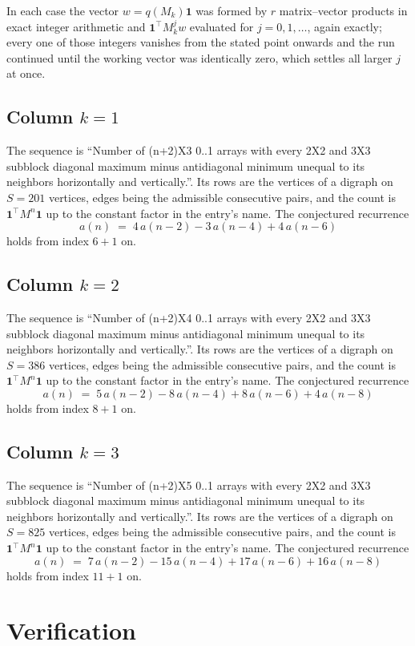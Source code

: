 \documentclass[11pt,a4paper]{article}
\theoremstyle{plain}
\theoremstyle{definition}
\begin{document}
In each case the vector $w=q(M_k)\mathbf{1}$ was formed by $r$ matrix--vector products in
exact integer arithmetic and $\mathbf{1}^{\!\top}M_k^{j}w$ evaluated for $j=0,1,\dots$,
again exactly; every one of those integers vanishes from the stated point onwards and the run
continued until the working vector was identically zero, which settles all larger $j$ at once.

\subsection*{Column $k$$=1$}
The sequence is ``Number of (n+2)X3 0..1 arrays with every 2X2 and 3X3 subblock diagonal maximum minus antidiagonal minimum unequal to its neighbors horizontally and vertically.''. Its rows are the vertices of a digraph on
$S=201$ vertices, edges being the admissible consecutive pairs, and the count is
$\mathbf{1}^{\!\top}M^{n}\mathbf{1}$ up to the constant factor in the entry's name.
The conjectured recurrence
\[
a(n)\;=\;4\,a(n-2) - 3\,a(n-4) + 4\,a(n-6)
\]
holds from index $6+1$ on.

\subsection*{Column $k$$=2$}
The sequence is ``Number of (n+2)X4 0..1 arrays with every 2X2 and 3X3 subblock diagonal maximum minus antidiagonal minimum unequal to its neighbors horizontally and vertically.''. Its rows are the vertices of a digraph on
$S=386$ vertices, edges being the admissible consecutive pairs, and the count is
$\mathbf{1}^{\!\top}M^{n}\mathbf{1}$ up to the constant factor in the entry's name.
The conjectured recurrence
\[
a(n)\;=\;5\,a(n-2) - 8\,a(n-4) + 8\,a(n-6) + 4\,a(n-8)
\]
holds from index $8+1$ on.

\subsection*{Column $k$$=3$}
The sequence is ``Number of (n+2)X5 0..1 arrays with every 2X2 and 3X3 subblock diagonal maximum minus antidiagonal minimum unequal to its neighbors horizontally and vertically.''. Its rows are the vertices of a digraph on
$S=825$ vertices, edges being the admissible consecutive pairs, and the count is
$\mathbf{1}^{\!\top}M^{n}\mathbf{1}$ up to the constant factor in the entry's name.
The conjectured recurrence
\[
a(n)\;=\;7\,a(n-2) - 15\,a(n-4) + 17\,a(n-6) + 16\,a(n-8)
\]
holds from index $11+1$ on.

\section{Verification}
\end{document}
